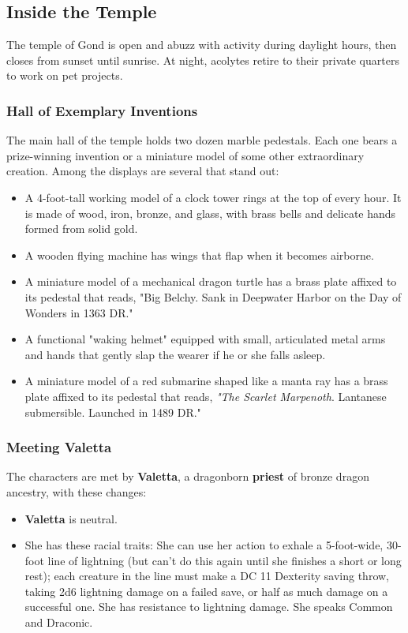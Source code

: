 \documentclass[10pt,a4paper,twoside,twocolumn,openany,nodeprecatedcode]{dndbook}
\begin{document}
\subsection{Inside the Temple}
The temple of Gond is open and abuzz with activity during daylight hours, then closes from sunset until sunrise. At night, acolytes retire to their private quarters to work on pet projects.
\subsubsection{Hall of Exemplary Inventions}
The main hall of the temple holds two dozen marble pedestals. Each one bears a prize-winning invention or a miniature model of some other extraordinary creation. Among the displays are several that stand out:
\begin{itemize}

\item A 4-foot-tall working model of a clock tower rings at the top of every hour. It is made of wood, iron, bronze, and glass, with brass bells and delicate hands formed from solid gold.
\item A wooden flying machine has wings that flap when it becomes airborne.
\item A miniature model of a mechanical dragon turtle has a brass plate affixed to its pedestal that reads, "Big Belchy. Sank in Deepwater Harbor on the Day of Wonders in 1363 DR."
\item A functional "waking helmet" equipped with small, articulated metal arms and hands that gently slap the wearer if he or she falls asleep.
\item A miniature model of a red submarine shaped like a manta ray has a brass plate affixed to its pedestal that reads, \textit{"The Scarlet Marpenoth}. Lantanese submersible. Launched in 1489 DR."
\end{itemize}


\subsubsection{Meeting Valetta}
The characters are met by \textbf{Valetta}, a dragonborn \textbf{priest} of bronze dragon ancestry, with these changes:
\begin{itemize}

\item \textbf{Valetta} is neutral.
\item She has these racial traits: She can use her action to exhale a 5-foot-wide, 30-foot line of lightning (but can't do this again until she finishes a short or long rest); each creature in the line must make a DC 11 Dexterity saving throw, taking 2d6 lightning damage on a failed save, or half as much damage on a successful one. She has resistance to lightning damage. She speaks Common and Draconic.
\end{itemize}
\end{document}
